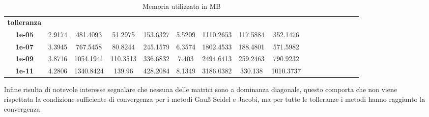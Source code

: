 \begin{table}[!ht]
\begin{subtable}[!ht]{1\textwidth}
{\begin{tabular}{|c|c|c|c|c|c|c|c|c|c|c|c|c|c|c|c|c|}
                \textbf{tolleranza} & ~                 & ~                 & ~             & ~             & ~                 & ~                 & ~             & ~             \\
                \textbf{1e-05}      & 2.9174            & 481.4093          & 51.2975       & 153.6327      & 5.5209            & 1110.2653         & 117.5884      & 352.1476      \\
                \textbf{1e-07}      & 3.3945            & 767.5458          & 80.8244       & 245.1579      & 6.3574            & 1802.4533         & 188.4801      & 571.5982      \\
                \textbf{1e-09}      & 3.8716            & 1054.1941         & 110.3513      & 336.6832      & 7.403             & 2494.6413         & 259.2463      & 790.9232      \\
                \textbf{1e-11}      & 4.2806            & 1340.8424         & 139.96        & 428.2084      & 8.1349            & 3186.0382         & 330.138       & 1010.3737     \\
            \end{tabular}
        }
        \caption{Vem 1 e Vem 2}
        \label{tab:vem_mem}
    \end{subtable}
    \caption{Memoria utilizzata in MB}
    \label{tab:memory}
\end{table}

Infine risulta di notevole interesse segnalare che nessuna delle matrici sono a 
dominanza diagonale, questo comporta che non viene rispettata la condizione sufficiente 
di convergenza per i metodi Gauß Seidel e Jacobi, ma per tutte le tolleranze i metodi 
hanno raggiunto la convergenza. 

